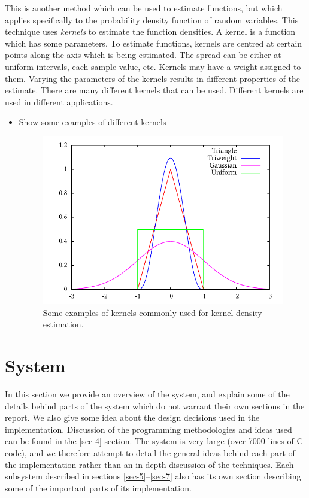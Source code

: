 \documentclass[a4paper,11pt]{article}
\begin{document}
   This is another method which can be used to estimate functions, but which
   applies specifically to the probability density function of random
   variables. This technique uses \emph{kernels} to estimate the function
   densities. A kernel is a function which has some parameters. To estimate
   functions, kernels are centred at certain points along the axis which is being
   estimated. The spread can be either at uniform intervals, each sample value,
   etc. Kernels may have a weight assigned to them. Varying the parameters of
   the kernels results in different properties of the estimate. There are many
   different kernels that can be used. Different kernels are used in different
   applications.
\begin{itemize}
\item Show some examples of different kernels
   \begin{center}
   \begin{figure}
   \includegraphics{kernel}
   \caption{Some examples of kernels commonly used for kernel density estimation.}
   \label{fig:kern}
   \end{figure}
   \end{center}
\end{itemize}
\section{System}
\label{sec-3}

  In this section we provide an overview of the system, and explain some of the
  details behind parts of the system which do not warrant their own sections in
  the report. We also give some idea about the design decisions used in the
  implementation. Discussion of the programming methodologies and ideas used can
  be found in the \ref{sec-4} section. The system is very large (over 7000 lines
  of C code), and we therefore attempt to detail the general ideas behind each
  part of the implementation rather than an in depth discussion of the
  techniques. Each subsystem described in sections \ref{sec-5}--\ref{sec-7} also has its own section describing some of the
  important parts of its implementation.
\end{document}
